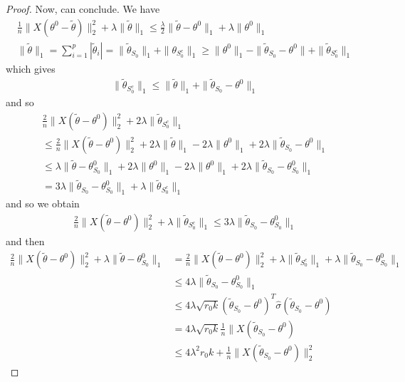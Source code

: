 \begin{proof}
  Now, can conclude.  We have
  \begin{align}
    \label{eq:128}
    \frac{1}{n} \| X(\theta^{0} - \tilde \theta) \|_{2}^{2} + \lambda
    \| \tilde \theta \|_{1} \leq \frac{\lambda}{2} \| \tilde \theta -
    \theta^{0} \|_{1} + \lambda \| \theta^{0} \|_{1} \\
    \| \tilde \theta \|_{1 } = \sum_{i=1}^{p} |\tilde \theta_{i}| = \|
    \tilde \theta_{S_{0}} \|_{1} + \| \theta_{S_{0}^{c}} \|_{1} \geq
    \| \theta^{0} \|_{1} - \| \tilde \theta_{S_{0}} - \theta^{0} \| +
    \| \tilde \theta_{S_{0}^{c}} \|_{1}
  \end{align} which gives
  \begin{align}
    \label{eq:129}
    \| \tilde \theta_{S_{0}^{c}} \|_{1} \leq \| \tilde \theta \|_{1} +
    \| \tilde \theta_{S_{0}} - \theta^{0} \|_{1}
  \end{align} and so
  \begin{align}
    \label{eq:130}
    \frac{2}{n} \| X(\tilde \theta - \theta^{0}) \|_{2}^{2} + 2
    \lambda \| \tilde \theta_{S_{0}^{c}} \|_{1} \\
    \leq \frac{2}{n} \| X(\tilde \theta - \theta^{0}) \|_{2}^{2} + 2
    \lambda \| \tilde \theta \|_{1} - 2 \lambda \| \theta^{0} \|_{1} +
    2 \lambda \| \tilde \theta_{S_{0}} - \theta^{0} \|_{1} \\
    \leq \lambda \| \tilde \theta - \theta_{S_{0}}^{0} \|_{1} + 2
    \lambda \| \theta^{0} \|_{1} - 2 \lambda \| \theta^{0} \|_{1} + 2
    \lambda \| \tilde \theta_{S_{0}} - \theta^{0}_{S_{0}} \|_{1} \\
    = 3 \lambda \| \tilde \theta_{S_{0}} - \theta^{0}_{S_{0}} \|_{1} +
    \lambda \| \tilde \theta_{S_{0}^{c}} \|_{1}
  \end{align} and so we obtain
  \begin{align}
    \label{eq:131}
    \frac{2}{n} \| X(\tilde \theta - \theta^{0}) \|_{2}^{2} + \lambda
    \| \tilde \theta_{S_{0}^{c}} \|_{1} \leq 3 \lambda \| \tilde
    \theta_{S_{0}} - \theta^{0}_{S_{0}} \|_{1}
  \end{align} and then
  \begin{align}
    \label{eq:132}
    \frac{2}{n} \| X(\tilde \theta - \theta^{0})\|_{2}^{2} + \lambda
    \| \tilde \theta - \theta_{S_{0}}^{0} \|_{1} &= \frac{2}{n} \|
    X(\tilde \theta - \theta^{0}) \|_{2}^{2} + \lambda \| \tilde
    \theta_{S_{0}^{c}} \|_{1} + \lambda \| \tilde \theta_{S_{0}} -
    \theta^{0}_{S_{0}} \|_{1} \\
    &\leq 4 \lambda \| \tilde \theta_{S_{0}} - \theta_{S_{0}}^{0}
    \|_{1} \\
    &\leq 4 \lambda \sqrt{r_{0} k}(\tilde \theta_{S_{0}} -
    \theta^{0})^{T} \hat \sigma (\tilde \theta_{S_{0}} - \theta^{0}) \\
    &= 4 \lambda \sqrt{r_{0} k } \frac{1}{n} \| X(\tilde \theta_{S_{0}}
    - \theta^{0}) \\
    &\leq 4 \lambda^{2} r_{0} k + \frac{1}{n} \| X(\tilde
    \theta_{S_{0}} - \theta^{0}) \|_{2}^{2}
  \end{align}


\end{proof}
